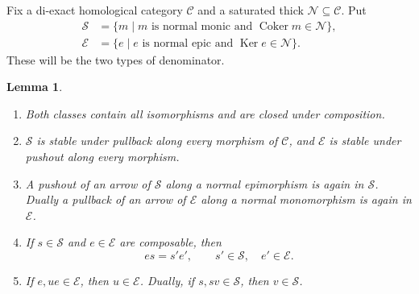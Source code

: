 \documentclass[11pt,reqno,a4paper]{amsart}
\newtheorem{lemma}[theorem]{Lemma}
\theoremstyle{definition}
\theoremstyle{remark}
\newcommand{\C}{\mathcal{C}}
\newcommand{\N}{\mathcal{N}}
\newcommand{\0}{\mathbf{0}}
\renewcommand{\1}{\mathbf{1}}
\DeclareMathOperator{\Ker}{Ker}
\DeclareMathOperator{\Coker}{Coker}
\newcommand{\Sden}{\mathcal S}
\newcommand{\Eden}{\mathcal E}
\begin{document}
Fix a di-exact homological category $\C$ and a saturated thick $\N\subseteq\C$. Put
\begin{align*}
 \Sden&=\{m\mid m\text{ is normal monic and }\Coker m\in\N\},\\
 \Eden&=\{e\mid e\text{ is normal epic and }\Ker e\in\N\}.
\end{align*}
These will be the two types of denominator.

\begin{lemma}\label{di:lem:denominators}$\;$
\begin{enumerate}[label=\textup{(\roman*)}]
\item Both classes contain all isomorphisms and are closed under composition.
\item $\Sden$ is stable under pullback along every morphism of $\C$, and $\Eden$ is stable under pushout along every morphism.
\item A pushout of an arrow of $\Sden$ along a normal epimorphism is again in $\Sden$. Dually a pullback of an arrow of $\Eden$ along a normal monomorphism is again in $\Eden$.
\item If $s\in\Sden$ and $e\in\Eden$ are composable, then
\[
 es=s'e',\qquad s'\in\Sden,\quad e'\in\Eden.
\]
\item If $e,ue\in\Eden$, then $u\in\Eden$. Dually, if $s,sv\in\Sden$, then $v\in\Sden$.
\end{enumerate}
\end{lemma}
\end{document}
